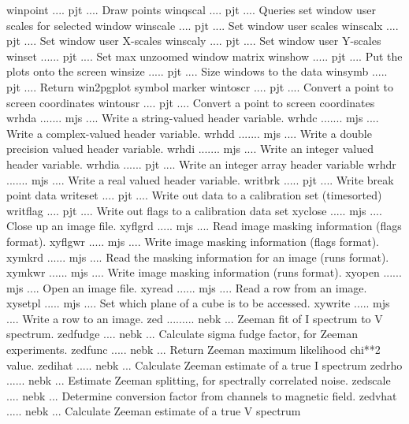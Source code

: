 {\eightpoint\begintt
winpoint .... pjt .... Draw points 
winqscal .... pjt .... Queries set window user scales for selected window 
winscale .... pjt .... Set window user scales 
winscalx .... pjt .... Set window user X-scales 
winscaly .... pjt .... Set window user Y-scales 
\endtt}
{\eightpoint\begintt
winset ...... pjt .... Set max unzoomed window matrix 
winshow ..... pjt .... Put the plots onto the screen 
winsize ..... pjt .... Size windows to the data 
winsymb ..... pjt .... Return win2pgplot symbol marker 
wintoscr .... pjt .... Convert a point to screen coordinates 
\endtt}
{\eightpoint\begintt
wintousr .... pjt .... Convert a point to screen coordinates 
wrhda ....... mjs .... Write a string-valued header variable. 
wrhdc ....... mjs .... Write a complex-valued header variable. 
wrhdd ....... mjs .... Write a double precision valued header variable. 
wrhdi ....... mjs .... Write an integer valued header variable. 
\endtt}
{\eightpoint\begintt
wrhdia ...... pjt .... Write an integer array header variable 
wrhdr ....... mjs .... Write a real valued header variable. 
writbrk ..... pjt .... Write break point data 
writeset .... pjt .... Write out data to a calibration set (timesorted) 
writflag .... pjt .... Write out flags to a calibration data set 
\endtt}
{\eightpoint\begintt
xyclose ..... mjs .... Close up an image file. 
xyflgrd ..... mjs .... Read image masking information (flags format). 
xyflgwr ..... mjs .... Write image masking information (flags format). 
xymkrd ...... mjs .... Read the masking information for an image (runs format). 
xymkwr ...... mjs .... Write image masking information (runs format). 
\endtt}
{\eightpoint\begintt
xyopen ...... mjs .... Open an image file. 
xyread ...... mjs .... Read a row from an image. 
xysetpl ..... mjs .... Set which plane of a cube is to be accessed. 
xywrite ..... mjs .... Write a row to an image. 
zed ......... nebk ... Zeeman fit of I spectrum to V spectrum. 
\endtt}
{\eightpoint\begintt
zedfudge .... nebk ... Calculate sigma fudge factor, for Zeeman experiments. 
zedfunc ..... nebk ... Return Zeeman maximum likelihood chi**2 value. 
zedihat ..... nebk ... Calculate Zeeman estimate of a true I spectrum 
zedrho ...... nebk ... Estimate Zeeman splitting, for spectrally correlated noise. 
zedscale .... nebk ... Determine conversion factor from channels to magnetic field. 
\endtt}
{\eightpoint\begintt
zedvhat ..... nebk ... Calculate Zeeman estimate of a true V spectrum 
\endtt}
